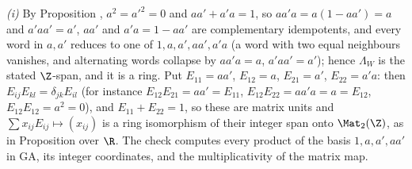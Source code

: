 \emph{(i)} By Proposition , $a^{2} = a'^{2} = 0$ and $aa' + a'a = 1$, so $aa'a = a(1 - aa') = a$ and $a'aa' = a'$, $aa'$ and $a'a = 1 - aa'$ are complementary idempotents, and every word in $a, a'$ reduces to one of $1, a, a', aa', a'a$ (a word with two equal neighbours vanishes, and alternating words collapse by $aa'a = a$, $a'aa' = a'$); hence $\Lambda_{W}$ is the stated $\Z$-span, and it is a ring. Put $E_{11} = aa'$, $E_{12} = a$, $E_{21} = a'$, $E_{22} = a'a$: then $E_{ij}E_{kl} = \delta_{jk}E_{il}$ (for instance $E_{12}E_{21} = aa' = E_{11}$, $E_{12}E_{22} = aa'a = a = E_{12}$, $E_{12}E_{12} = a^{2} = 0$), and $E_{11} + E_{22} = 1$, so these are matrix units and $\sum x_{ij}E_{ij} \mapsto (x_{ij})$ is a ring isomorphism of their integer span onto $\Mat_{2}(\Z)$, as in Proposition  over $\R$. The check computes every product of the basis $1, a, a', aa'$ in GA, its integer coordinates, and the multiplicativity of the matrix map.

